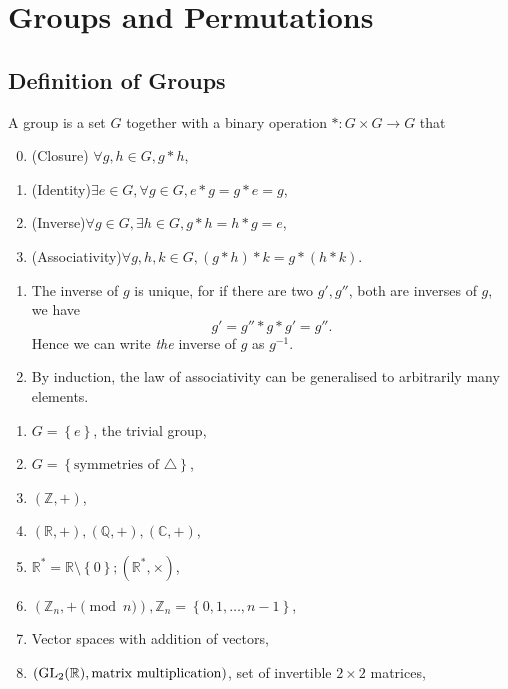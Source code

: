 \documentclass[a4paper]{article}
\begin{document}
\maketitle
\tableofcontents

\section{Groups and Permutations}

\subsection{Definition of Groups}
\begin{definition}[Group]
  A group is a set $G$ together with a binary operation $ \ast:
  G\times G \to G $ that
  \begin{enumerate}[({G}1)]
      \setcounter{enumi}{-1}
    \item (Closure) $ \forall g,h\in G, g\ast h $,
    \item (Identity)$ \exists e\in G, \forall g\in G, e*g = g*e = g $,
    \item (Inverse)$ \forall g\in G, \exists h\in G, g * h = h*g = e $,
    \item (Associativity)$ \forall g,h,k\in G, (g*h)*k = g*(h*k) $.
  \end{enumerate}
\end{definition}
\begin{remark}
  \begin{enumerate}[(1)]
    \item         The inverse of $g$ is unique, for if there are two
      $g',g''$, both are inverses of $g$, we have
      \[
        g' = g''*g*g' = g''
      .\]
      Hence we can write \textit{the} inverse of $g$ as $ g^{-1} $.
    \item By induction, the law of associativity can be generalised
      to arbitrarily many elements.
  \end{enumerate}
\end{remark}
\begin{example}
  \begin{enumerate}[(1)]
    \item $G = \left\{ e\right\}$, the trivial group,
    \item $ G = \left\{ \text{symmetries of } \triangle \right\} $,
    \item $ (\mathbb{Z} , +) $,
    \item $ (\mathbb{R} ,+), (\mathbb{Q} , +), (\mathbb{C} , +) $,
    \item $ \mathbb{R}^* = \mathbb{R} \setminus \left\{ 0\right\};
      (\mathbb{R}^*, \times) $,
    \item $ (\mathbb{Z}_n, + \pmod n), \mathbb{Z}_n = \left\{
      0,1,\dots, n-1\right\} $,
    \item Vector spaces with addition of vectors,
    \item $ (\rm{GL}_2(\mathbb{R}), \text{matrix multiplication}) $,
      set of invertible $2\times 2$ matrices,
  \end{enumerate}
\end{example}
\end{document}
